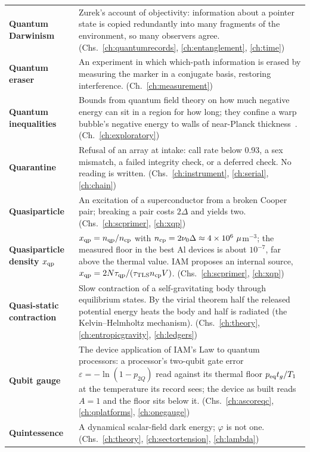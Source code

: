 {\begin{longtable}{@{}>{\raggedright\arraybackslash}p{}>{\raggedright\arraybackslash}p{}@{}}
\textbf{Quantum Darwinism} & Zurek's account of objectivity: information about a pointer state is copied redundantly into many fragments of the environment, so many observers agree. {\footnotesize(Chs.~\ref{ch:quantumrecords}, \ref{ch:entanglement}, \ref{ch:time})}\\[1pt]
\textbf{Quantum eraser} & An experiment in which which-path information is erased by measuring the marker in a conjugate basis, restoring interference. {\footnotesize(Ch.~\ref{ch:measurement})}\\[1pt]
\textbf{Quantum inequalities} & Bounds from quantum field theory on how much negative energy can sit in a region for how long; they confine a warp bubble's negative energy to walls of near-Planck thickness~\cite{PfenningFord1997}. {\footnotesize(Ch.~\ref{ch:exploratory})}\\[1pt]
\textbf{Quarantine} & Refusal of an array at intake: call rate below 0.93, a sex mismatch, a failed integrity check, or a deferred check. No reading is written. {\footnotesize(Chs.~\ref{ch:instrument}, \ref{ch:serial}, \ref{ch:chain})}\\[1pt]
\textbf{Quasiparticle} & An excitation of a superconductor from a broken Cooper pair; breaking a pair costs $2\Delta$ and yields two. {\footnotesize(Chs.~\ref{ch:scprimer}, \ref{ch:xqp})}\\[1pt]
\textbf{Quasiparticle density $x_{\mathrm{qp}}$} & $x_{\mathrm{qp}}=n_{\rm qp}/n_{\mathrm{cp}}$ with $n_{\mathrm{cp}}=2\nu_0\Delta\approx4\times10^6~\mu$m$^{-3}$; the measured floor in the best Al devices is about $10^{-7}$, far above the thermal value. IAM proposes an internal source, $x_{\mathrm{qp}}=2N\tau_{\mathrm{qp}}/(\tau_{\mathrm{TLS}}n_{\mathrm{cp}} V)$. {\footnotesize(Chs.~\ref{ch:scprimer}, \ref{ch:xqp})}\\[1pt]
\textbf{Quasi-static contraction} & Slow contraction of a self-gravitating body through equilibrium states. By the virial theorem half the released potential energy heats the body and half is radiated (the Kelvin--Helmholtz mechanism). {\footnotesize(Chs.~\ref{ch:theory}, \ref{ch:entropicgravity}, \ref{ch:ledgers})}\\[1pt]
\textbf{Qubit gauge} & The device application of IAM's Law to quantum processors: a processor's two-qubit gate error $\varepsilon=-\ln(1-p_{2Q})$ read against its thermal floor $p_{\rm eq}t_g/T_1$ at the temperature its record sees; the device as built reads $A=1$ and the floor sits below it. {\footnotesize(Chs.~\ref{ch:ascoreqc}, \ref{ch:qplatforms}, \ref{ch:onegauge})}\\[1pt]
\textbf{Quintessence} & A dynamical scalar-field dark energy; $\varphi$ is not one. {\footnotesize(Chs.~\ref{ch:theory}, \ref{ch:sectortension}, \ref{ch:lambda})}\\[1pt]

\end{longtable}}

